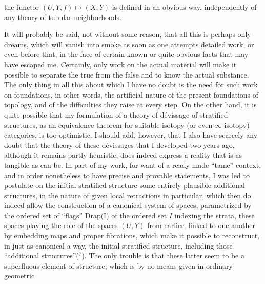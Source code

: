
the functor $(U,Y,f) \longmapsto (X,Y)$ is defined in an obvious way,
independently of any theory of tubular neighborhoods.

It will probably be said, not without some reason, that all
this is perhaps only dreams, which will vanish into smoke as soon
as one attempts detailed work, or even before that,
in the face of certain known or quite obvious facts that may have
escaped me. Certainly, only work on the actual material will make it possible to
separate the true from the false and to know the actual substance. The
only thing in all this about which I have no
doubt is the need for such work on foundations, in
other words, the artificial nature of the present foundations of
topology, and of the difficulties they raise at every
step. On the other hand, it is quite possible that my formulation
of a theory of dévissage of stratified structures, as
an equivalence theorem for suitable isotopy (or even
$\infty$-isotopy) categories, is too optimistic. I should add,
however, that I also have scarcely any doubt that the theory
of these dévissages that I developed two years ago, although
it remains partly heuristic, does indeed express a reality
that is as tangible as can be. In part of my work,
for want of a ready-made ``tame'' context, and
in order nonetheless to have precise and provable statements,
I was led to postulate on the initial stratified structure
some entirely plausible additional structures,
in the nature of given local retractions in particular,
which then do indeed allow the construction of a canonical system
of spaces, parametrized by the ordered set of ``flags'' Drap(I)
of the ordered set $I$ indexing the strata, these spaces playing
the role of the spaces $(U,Y)$ from earlier, linked to one another by
embedding maps and proper fibrations, which make it
possible to reconstruct, in just as canonical a way, the initial
stratified structure, including those ``additional structures''(${}^{7}$).
The only trouble is that these latter seem to be a superfluous element of
structure, which is by no means given in ordinary geometric

